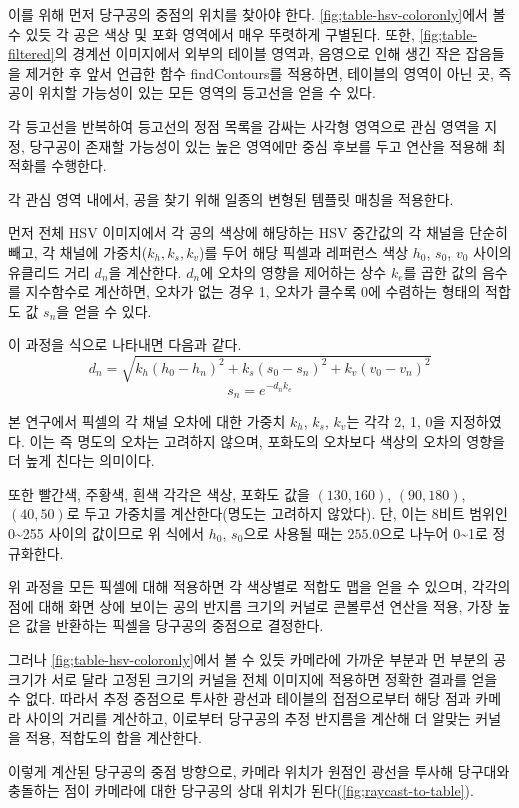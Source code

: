 \documentclass[10pt]{oblivoir}
\begin{document}
이를 위해 먼저 당구공의 중점의 위치를 찾아야 한다. \cref{fig;table-hsv-coloronly}에서 볼 수 있듯 각 공은 색상 및 포화 영역에서 매우 뚜렷하게 구별된다. 또한, \cref{fig;table-filtered}의 경계선 이미지에서 외부의 테이블 영역과, 음영으로 인해 생긴 작은 잡음들을 제거한 후 앞서 언급한 함수 findContours를 적용하면, 테이블의 영역이 아닌 곳, 즉 공이 위치할 가능성이 있는 모든 영역의 등고선을 얻을 수 있다.

각 등고선을 반복하여 등고선의 정점 목록을 감싸는 사각형 영역으로 관심 영역을 지정, 당구공이 존재할 가능성이 있는 높은 영역에만 중심 후보를 두고 연산을 적용해 최적화를 수행한다.

각 관심 영역 내에서, 공을 찾기 위해 일종의 변형된 템플릿 매칭을 적용한다.

먼저 전체 HSV 이미지에서 각 공의 색상에 해당하는 HSV 중간값의 각 채널을 단순히 빼고, 각 채널에 가중치($k_h, k_s, k_v$)를 두어 해당 픽셀과 레퍼런스 색상 $h_0$, $s_0$, $v_0$ 사이의 유클리드 거리 $d_n$을 계산한다. $d_n$에 오차의 영향을 제어하는 상수 $k_e$를 곱한 값의 음수를 지수함수로 계산하면, 오차가 없는 경우 1, 오차가 클수록 0에 수렴하는 형태의 적합도 값 $s_n$을 얻을 수 있다.

이 과정을 식으로 나타내면 다음과 같다.
$$ d_{n} = \sqrt{k_h(h_0-h_n)^2+k_s(s_0-s_n)^2+k_v(v_0-v_n)^2} $$
$$ s_{n} = e^{-d_{n}k_{e}} $$

본 연구에서 픽셀의 각 채널 오차에 대한 가중치 $k_h$, $k_s$, $k_v$는 각각 2, 1, 0을 지정하였다. 이는 즉 명도의 오차는 고려하지 않으며, 포화도의 오차보다 색상의 오차의 영향을 더 높게 친다는 의미이다.

또한 빨간색, 주황색, 흰색 각각은 색상, 포화도 값을 $(130, 160)$, $(90, 180)$, $(40, 50)$로 두고 가중치를 계산한다(명도는 고려하지 않았다). 단, 이는 8비트 범위인 0\~{}255 사이의 값이므로 위 식에서 $h_0$, $s_0$으로 사용될 때는 $255.0$으로 나누어 0\~{}1로 정규화한다.

위 과정을 모든 픽셀에 대해 적용하면 각 색상별로 적합도 맵을 얻을 수 있으며, 각각의 점에 대해 화면 상에 보이는 공의 반지름 크기의 커널로 콘볼루션 연산을 적용, 가장 높은 값을 반환하는 픽셀을 당구공의 중점으로 결정한다.

그러나 \cref{fig;table-hsv-coloronly}에서 볼 수 있듯 카메라에 가까운 부분과 먼 부분의 공 크기가 서로 달라 고정된 크기의 커널을 전체 이미지에 적용하면 정확한 결과를 얻을 수 없다. 따라서 추정 중점으로 투사한 광선과 테이블의 접점으로부터 해당 점과 카메라 사이의 거리를 계산하고, 이로부터 당구공의 추정 반지름을 계산해 더 알맞는 커널을 적용, 적합도의 합을 계산한다.

이렇게 계산된 당구공의 중점 방향으로, 카메라 위치가 원점인 광선을 투사해 당구대와 충돌하는 점이 카메라에 대한 당구공의 상대 위치가 된다(\cref{fig;raycast-to-table}).
\end{document}
